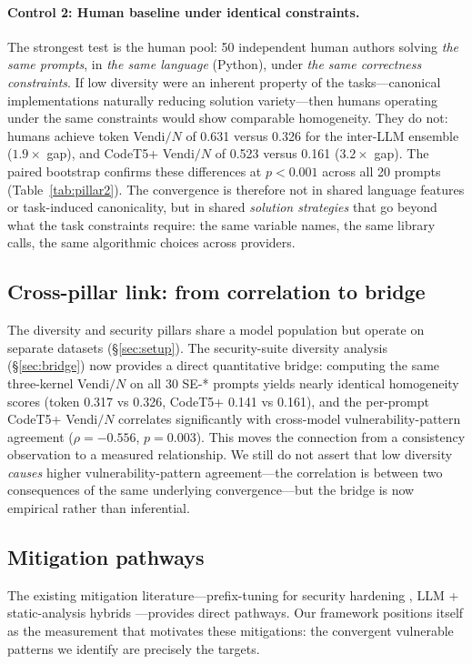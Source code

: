 \documentclass{article}
\begin{document}
\paragraph{Control 2: Human baseline under identical constraints.}
The strongest test is the human pool: 50 independent human authors solving
\emph{the same prompts}, in \emph{the same language} (Python), under
\emph{the same correctness constraints}. If low diversity were an inherent
property of the tasks---canonical implementations naturally reducing solution
variety---then humans operating under the same constraints would show
comparable homogeneity. They do not: humans achieve token Vendi$/N$ of 0.631
versus 0.326 for the inter-LLM ensemble ($1.9\times$ gap), and CodeT5+
Vendi$/N$ of 0.523 versus 0.161 ($3.2\times$ gap). The paired bootstrap
confirms these differences at $p<0.001$ across all 20 prompts
(Table~\ref{tab:pillar2}). The convergence is therefore not in shared
language features or task-induced canonicality, but in shared
\emph{solution strategies} that go beyond what the task constraints require:
the same variable names, the same library calls, the same algorithmic
choices across providers.

\subsection{Cross-pillar link: from correlation to bridge}

The diversity and security pillars share a model population but operate on
separate datasets (\S\ref{sec:setup}). The security-suite diversity
analysis (\S\ref{sec:bridge}) now provides a direct quantitative bridge:
computing the same three-kernel Vendi$/N$ on all 30 SE-* prompts yields
nearly identical homogeneity scores (token 0.317 vs 0.326, CodeT5+ 0.141
vs 0.161), and the per-prompt CodeT5+ Vendi$/N$ correlates significantly
with cross-model vulnerability-pattern agreement ($\rho = -0.556$,
$p = 0.003$). This moves the connection from a consistency observation to a
measured relationship. We still do not assert that low diversity
\emph{causes} higher vulnerability-pattern agreement---the correlation is
between two consequences of the same underlying convergence---but the
bridge is now empirical rather than inferential.

\subsection{Mitigation pathways}

The existing mitigation literature---prefix-tuning for security hardening
\citep{he2023sven,he2024safecoder}, LLM + static-analysis hybrids
\citep{li2025iris}---provides direct pathways. Our framework positions itself
as the measurement that motivates these mitigations: the convergent
vulnerable patterns we identify are precisely the targets.
\end{document}
